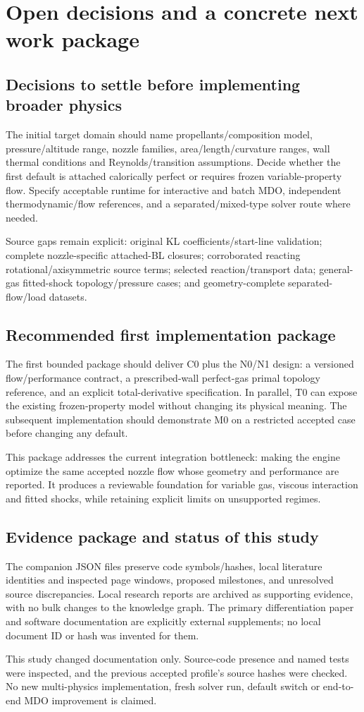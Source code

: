 \section{Open decisions and a concrete next work package}
\label{sec:next}
\subsection{Decisions to settle before implementing broader physics}
The initial target domain should name propellants/composition model,
pressure/altitude range, nozzle families, area/length/curvature ranges,
wall thermal conditions and Reynolds/transition assumptions. Decide
whether the first default is attached calorically perfect or requires
frozen variable-property flow. Specify acceptable runtime for interactive
and batch MDO, independent thermodynamic/flow references, and a
separated/mixed-type solver route where needed.

Source gaps remain explicit: original KL coefficients/start-line
validation; complete nozzle-specific attached-BL closures; corroborated
reacting rotational/axisymmetric source terms; selected reaction/transport
data; general-gas fitted-shock topology/pressure cases; and
geometry-complete separated-flow/load datasets.

\subsection{Recommended first implementation package}
The first bounded package should deliver C0 plus the N0/N1 design:
a versioned flow/performance contract, a prescribed-wall perfect-gas
primal topology reference, and an explicit total-derivative specification.
In parallel, T0 can expose the existing frozen-property model without
changing its physical meaning. The subsequent implementation should
demonstrate M0 on a restricted accepted case before changing any default.

This package addresses the current integration bottleneck: making the
engine optimize the same accepted nozzle flow whose geometry and
performance are reported. It produces a reviewable foundation for
variable gas, viscous interaction and fitted shocks, while retaining
explicit limits on unsupported regimes.

\subsection{Evidence package and status of this study}
The companion JSON files preserve code symbols/hashes, local literature
identities and inspected page windows, proposed milestones, and unresolved
source discrepancies. Local research reports are archived as supporting
evidence, with no bulk changes to the knowledge graph. The primary
differentiation paper and software documentation are explicitly external
supplements; no local document ID or hash was invented for them.

This study changed documentation only. Source-code presence and named
tests were inspected, and the previous accepted profile's source hashes
were checked. No new multi-physics implementation, fresh solver run,
default switch or end-to-end MDO improvement is claimed.
